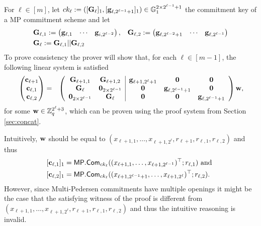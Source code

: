 For \(\ell\in[m]\), let \(ck_\ell:=([\mathbf{{G}}_\ell]_1,\allowbreak[\mathbf{g}_{\ell,2^{\ell-1}+1}]_1)\in\mathbb{G}_1^{2\times{2^{\ell-1}+1}}\) the commitment key of a MP commitment scheme and let
\begin{align*}
&\mathbf{{G}}_{\ell,1}:=
\begin{pmatrix}
    \mathbf{g}_{\ell,1}&\cdots&\mathbf{g}_{i,2^{\ell-2}}
\end{pmatrix},
&\mathbf{{G}}_{\ell,2}:=
\begin{pmatrix}
    \mathbf{g}_{\ell,2^{\ell-2}+1}&\cdots&\mathbf{g}_{\ell,2^{\ell-1}}
\end{pmatrix}\\
&\mathbf{{G}}_\ell:=\mathbf{{G}}_{\ell,1}||\mathbf{{G}}_{\ell,2}
\end{align*}
To prove consistency the prover will show that, for each $\ell\in [m-1]$, the following linear system is satisfied
{\begin{align}
&\begin{pmatrix}
\mathbf{c}_{\ell+1}\\
\mathbf{c}_{\ell,1}\\
\mathbf{c}_{\ell,2}
\end{pmatrix}
=
&\left(\begin{array}{cc|ccc}
\mathbf{{G}}_{\ell+1,1}           & \mathbf{{G}}_{\ell+1,2}            & \mathbf{g}_{\ell+1,2^\ell+1} & \mathbf{0}                     & \mathbf{0}\\
\mathbf{{G}}_{\ell}               & \mathbf{{0}}_{2\times2^{\ell-1}}   & \mathbf{0}                   & \mathbf{g}_{\ell,2^{\ell-1}+1} & \mathbf{0} \\
\mathbf{{0}}_{2\times 2^{\ell-1}} & \mathbf{{G}}_{\ell}                & \mathbf{0}                   & \mathbf{0}                     & \mathbf{g}_{\ell,2^{\ell-1}+1}
\end{array}\right)
\mathbf{w},\label{eq-log-split}
\end{align}}%
for some \(\mathbf{w}\in\mathbb{Z}_q^{2^\ell+3}\), which can be proven using the proof system from Section \ref{sec:concat}.

Intuitively, \(\mathbf{w}\) should be equal to \((x_{\ell+1,1},\ldots,x_{\ell+1,2^{\ell}},\allowbreak r_{\ell+1},r_{\ell,1},r_{\ell,2})\) and thus 
\begin{align*}
&[\mathbf{c}_{\ell,1}]_1=\mathsf{MP}.\mathsf{Com}_{ck_\ell}(\allowbreak(x_{\ell+1,1},\ldots,x_{\ell+1,2^{\ell-1}})^\top;r_{\ell,1})\text{ and }\\
&[\mathbf{c}_{\ell,2}]_1=\mathsf{MP}.\mathsf{Com}_{ck_\ell}((x_{\ell+1,2^{\ell-1}+1},\ldots, x_{\ell+1,2^{\ell}})^\top;r_{\ell,2}).
\end{align*}
However, since Multi-Pedersen commitments have multiple openings it might be the case that the satisfying witness of the proof is different from \((x_{\ell+1,1},\ldots,\allowbreak x_{\ell+1,2^\ell},r_{\ell+1},r_{\ell,1},r_{\ell,2})\) and thus the intuitive reasoning is invalid.

